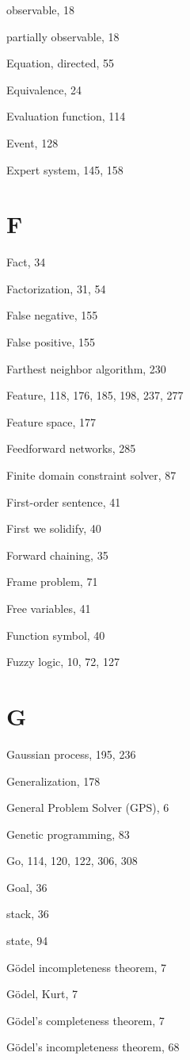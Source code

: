 \documentclass[10pt]{book}
\begin{document}
observable, 18

partially observable, 18

Equation, directed, 55

Equivalence, 24

Evaluation function, 114

Event, 128

Expert system, 145, 158
\section{F}

Fact, 34

Factorization, 31, 54

False negative, 155

False positive, 155

Farthest neighbor algorithm, 230

Feature, 118, 176, 185, 198, 237, 277

Feature space, 177

Feedforward networks, 285

Finite domain constraint solver, 87

First-order sentence, 41

First we solidify, 40

Forward chaining, 35

Frame problem, 71

Free variables, 41

Function symbol, 40

Fuzzy logic, 10, 72, 127

\section{G}

Gaussian process, 195, 236

Generalization, 178

General Problem Solver (GPS), 6

Genetic programming, 83

Go, 114, 120, 122, 306, 308

Goal, 36

stack, 36

state, 94

G\"odel incompleteness theorem, 7

G\"odel, Kurt, 7

G\"odel's completeness theorem, 7

G\"odel's incompleteness theorem, 68
\end{document}
